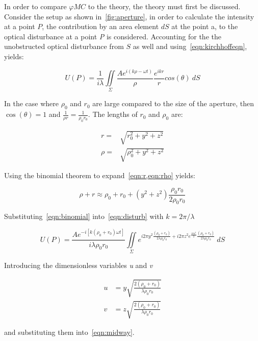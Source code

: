 In order to compare $\varphi MC$ to the theory, the theory must first be discussed.
Consider the setup as shown in~\cref{fig:aperture}, in order to calculate the intensity at a point $P$, the contribution by an area element $dS$ at the point a, to the optical disturbance at a point \textit{P} is considered.
Accounting for the the unobstructed optical disturbance from $S$ as well and using~\cref{eqn:kirchhoffeqn}, yields: 


\begin{equation}
U(P)=\frac{1}{i\lambda}\iint\limits_{\Sigma} \frac{Ae^{i(k\rho-\omega t)}}{\rho} \frac{e^{ikr}}{r}cos(\theta)\ dS
\label{eqn:disturb}
\end{equation}


In the case where $\rho_0$ and $r_0$ are large compared to the size of the aperture, then $\cos(\theta) = 1$ and $\tfrac{1}{\rho r}=\tfrac{1}{\rho_0 r_0}$.
The lengths of $r_0$ and $\rho_0$ are:

\begin{align}
r=&\sqrt{r_0^2+y^2+z^2}\label{eqn:r} \\
\rho=&\sqrt{\rho_0^2+y^2+z^2}\label{eqn:rho}
\end{align}

Using the binomial theorem to expand~\cref{eqn:r,eqn:rho} yields:

\begin{equation}
\rho + r \approx \rho_0 + r_0 + (y^2+z^2)\frac{\rho_0r_0}{2\rho_0r_0}
\label{eqn:binomial}
\end{equation}

Substituting~\cref{eqn:binomial} into~\cref{eqn:disturb} with $k=2\pi/\lambda$

\begin{equation}
U(P)=\frac{Ae^{-i[k(\rho_0+r_0)\omega t]}}{i\lambda\rho_0r_0}\iint\limits_{\Sigma} e^{i2\pi y^2\tfrac{(\rho_0+r_0)}{2\lambda\rho_0r_0}+i2\pi z^2e^{\frac{i\pi u^2}{2}}\tfrac{(\rho_0+r_0)}{2\lambda\rho_0r_0}} \ dS
\label{eqn:midway}
\end{equation}


Introducing the dimensionless variables \textit{u} and \textit{v}

\begin{align}
u&=y\sqrt{\frac{2(\rho_0+r_0)}{\lambda\rho_0r_0}}\\
v&=z\sqrt{\frac{2(\rho_0+r_0)}{\lambda\rho_0r_0}}
\end{align}

and substituting them into~\cref{eqn:midway}.

